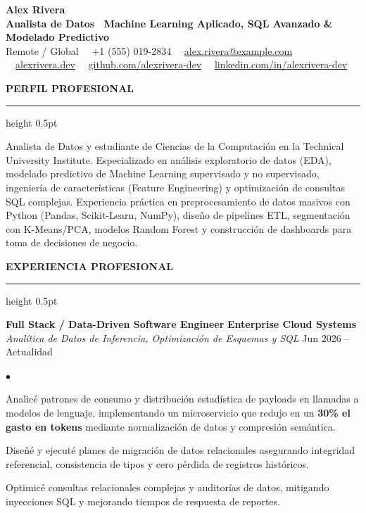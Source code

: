 \documentclass[10pt,letterpaper]{article}
\newcommand{\resumesection}[1]{%
  \vspace{2pt}%
  {\color{primary}\normalsize\bfseries\MakeUppercase{#1}}%
  \vspace{1pt}\hrule height 0.5pt\vspace{2pt}%
}
\renewenvironment{itemize}{%
  \begin{list}{\color{primary}$\bullet$}{%
    \setlength{\leftmargin}{1.1em}%
    \setlength{\itemsep}{0.2pt}%
    \setlength{\topsep}{0.5pt}%
    \setlength{\parsep}{0pt}%
    \setlength{\partopsep}{0pt}%
  }%
}{%
  \end{list}%
}
\begin{document}
\color{textdark}

\begin{center}
    {\LARGE \textbf{\color{primary} Alex Rivera}} \\ \vspace{1.5pt}
    {\large \textbf{Analista de Datos \textbar\ Machine Learning Aplicado, SQL Avanzado \& Modelado Predictivo}} \\ \vspace{2pt}
    {\small
        Remote / Global \ \textbullet \
        +1 (555) 019-2834 \ \textbullet \
        \href{mailto:alex.rivera@example.com}{alex.rivera@example.com} \ \textbullet \
        \href{https://alexrivera.dev}{alexrivera.dev} \ \textbullet \
        \href{https://github.com/alexrivera-dev}{github.com/alexrivera-dev} \ \textbullet \
        \href{https://linkedin.com/in/alexrivera-dev}{linkedin.com/in/alexrivera-dev}
    }
\end{center}

\vspace{-6pt}

\resumesection{Perfil Profesional}
{\small Analista de Datos y estudiante de Ciencias de la Computación en la Technical University Institute. Especializado en análisis exploratorio de datos (EDA), modelado predictivo de Machine Learning supervisado y no supervisado, ingeniería de características (Feature Engineering) y optimización de consultas SQL complejas. Experiencia práctica en preprocesamiento de datos masivos con Python (Pandas, Scikit-Learn, NumPy), diseño de pipelines ETL, segmentación con K-Means/PCA, modelos Random Forest y construcción de dashboards para toma de decisiones de negocio.}

\resumesection{Experiencia Profesional}

\textbf{Full Stack / Data-Driven Software Engineer} \hfill \textbf{Enterprise Cloud Systems} \\
\textit{Analítica de Datos de Inferencia, Optimización de Esquemas y SQL} \hfill Jun 2026 -- Actualidad
\begin{itemize}
    \item Analicé patrones de consumo y distribución estadística de payloads en llamadas a modelos de lenguaje, implementando un microservicio que redujo en un \textbf{30\% el gasto en tokens} mediante normalización de datos y compresión semántica.
    \item Diseñé y ejecuté planes de migración de datos relacionales asegurando integridad referencial, consistencia de tipos y cero pérdida de registros históricos.
    \item Optimicé consultas relacionales complejas y auditorías de datos, mitigando inyecciones SQL y mejorando tiempos de respuesta de reportes.
\end{itemize}
\end{document}
